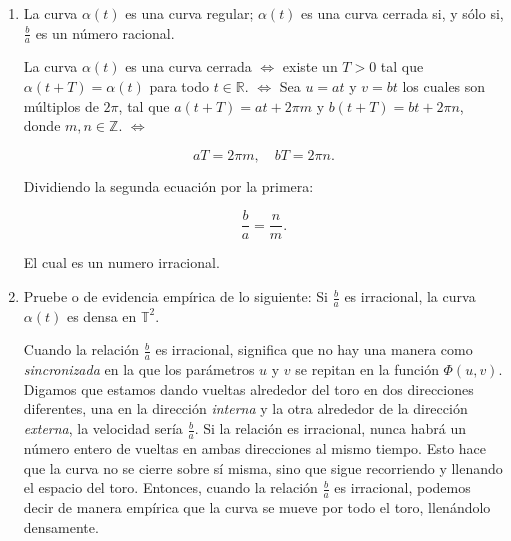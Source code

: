 \begin{problema}
\begin{enumerate}
\begin{sol}
        
        
        
      
        
    \end{sol}
    \item La curva $\alpha(t)$ es una curva regular; $\alpha(t)$ es una curva cerrada si, y sólo si, $\frac{b}{a}$ es un número racional.
    \begin{sol}
        
        La curva $\alpha(t)$ es una curva cerrada $\iff$ existe un $T > 0$ tal que $\alpha(t + T) = \alpha(t)$ para todo $t \in \mathbb{R}$.  $\iff$ Sea $u = at$ y $v = bt$ los cuales son múltiplos de $2\pi$, tal que $a(t + T) = at + 2\pi m$ y $b(t + T) = bt + 2\pi n$, donde $m,n\in \mathbb{Z}$. $\iff$

$$
aT = 2\pi m, \quad bT = 2\pi n.
$$

Dividiendo la segunda ecuación por la primera:

$$
\frac{b}{a} = \frac{n}{m}.
$$

El cual es un numero irracional.
    \end{sol}
    \item Pruebe o de evidencia empírica de lo siguiente: Si $\frac{b}{a}$ es irracional, la curva $\alpha(t)$ es densa en $\mathbb{T}^{2}$.
    \begin{sol}
        Cuando la relación $\frac{b}{a}$ es irracional, significa que no hay una manera como \textit{sincronizada} en la que los parámetros $u$ y $v$ se repitan en la función $\Phi(u, v)$. Digamos que estamos dando vueltas alrededor del toro en dos direcciones diferentes, una en la dirección \textit{interna} y la otra alrededor de la dirección \textit{externa}, la velocidad sería $\frac{b}{a}$. Si la relación es irracional, nunca habrá un número entero de vueltas en ambas direcciones al mismo tiempo. Esto hace que la curva no se cierre sobre sí misma, sino que sigue recorriendo y llenando el espacio del toro. Entonces, cuando la relación $\frac{b}{a}$ es irracional, podemos decir de manera empírica que la curva se mueve por todo el toro, llenándolo densamente.
    \end{sol}
\end{enumerate}

\begin{sol}
   
\end{sol}


\end{problema}


